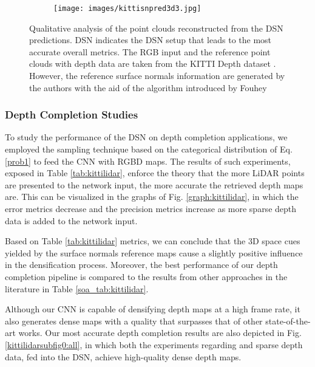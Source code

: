 \documentclass[5p]{elsarticle}
\begin{document}
\begin{figure*}[t!]
\begin{subfigure}[t]{0.19\textwidth}
         \hspace{1em}
         \texttt{[image: images/kittisnpred3d3.jpg]}
         \label{kittisubfig3d:4}
     \end{subfigure}
     \caption{Qualitative analysis of the point clouds reconstructed from the DSN predictions. DSN indicates the DSN setup that leads to the most accurate overall metrics. The RGB input and the reference point clouds with depth data are taken from the KITTI Depth dataset \cite{uhrig2017sparsity}. However, the reference surface normals information are generated by the authors with the aid of the algorithm introduced by Fouhey \etal\cite{fouhey2013data}}
     \label{kittisubfig3d:all}
\end{figure*}


\subsubsection{Depth Completion Studies}

To study the performance of the DSN on depth completion applications, we employed the sampling technique based on the categorical distribution of Eq. \ref{prob1} to feed the CNN with RGBD maps. The results of such experiments, exposed in Table \ref{tab:kittilidar}, enforce the theory that the more LiDAR points are presented to the network input, the more accurate the retrieved depth maps are. This can be visualized in the graphs of Fig. \ref{graph:kittilidar}, in which the error metrics decrease and the precision metrics increase as more sparse depth data is added to the network input.

Based on Table \ref{tab:kittilidar} metrics, we can conclude that the 3D space cues yielded by the surface normals reference maps cause a slightly positive influence in the densification process. Moreover, the best performance of our depth completion pipeline is compared to the results from other approaches in the literature in Table \ref{soa_tab:kittilidar}. 

Although our CNN is capable of densifying depth maps at a high frame rate, it also generates dense maps with a quality that surpasses that of other state-of-the-art works. Our most accurate depth completion results are also depicted in Fig. \ref{kittilidarsubfig0:all}, in which both the experiments regarding  and  sparse depth data, fed into the DSN, achieve high-quality dense depth maps.
\end{document}
